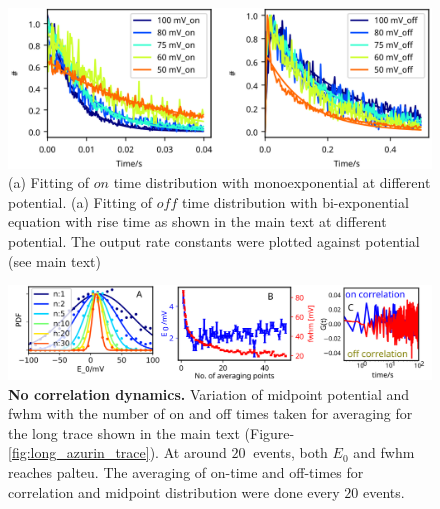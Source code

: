 \begin{figure}
  \centering
  \includegraphics[width=\textwidth]{rate_fit_all_potential}
  \makeatletter
  \renewcommand{\fnum@figure}{\figurename~S\thefigure}
  \makeatother
  \caption{(a) Fitting of $on$ time distribution with monoexponential at different potential.
  (a) Fitting of $off$ time distribution with bi-exponential equation with rise time as shown in the main text at different potential.
  The output rate constants were plotted against potential (see main text)}
  \label{SIfig: rate_fit_all_potential}
\end{figure}
\begin{figure}
  \centering
  \includegraphics[width=\textwidth]{N_avgpoints_vs_fwhmwidth}
  \makeatletter
  \renewcommand{\fnum@figure}{\figurename~S\thefigure}
  \makeatother
  \caption{\textbf{No correlation dynamics.} Variation of midpoint potential and fwhm with the number of on and off times taken for averaging for the long trace shown in the main text (Figure-\ref{fig:long_azurin_trace}). At around $20~$ events, both $E_0$ and fwhm reaches palteu.
  The averaging of on-time and off-times for correlation and midpoint distribution were done every $20$ events.}
  \label{fig: N_avgpoints_vs_fwhmwidth}
\end{figure}

